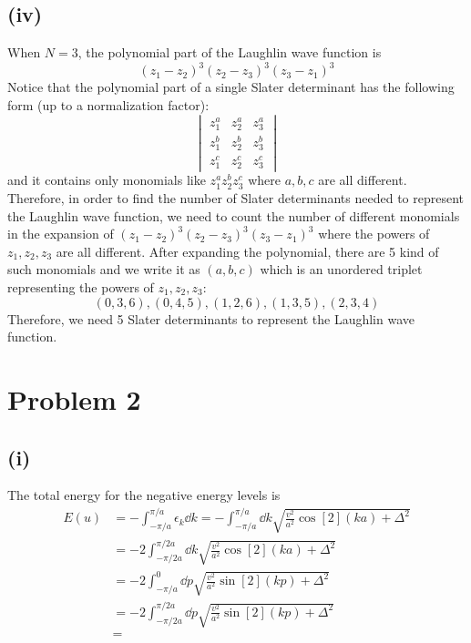 \documentclass{article}
\begin{document}
\subsection*{(iv)}
When $N=3$, the polynomial part of the Laughlin wave function is
\begin{equation}
    (z_1-z_2)^3(z_2-z_3)^3(z_3-z_1)^3
\end{equation}
Notice that the polynomial part of a single Slater determinant has the following form (up to a normalization factor):
\begin{equation}
    \begin{vmatrix}
        z_1^{a} & z_2^{a} & z_3^{a}\\
        z_1^{b} & z_2^{b} & z_3^{b}\\
        z_1^{c} & z_2^{c} & z_3^{c}
    \end{vmatrix}
\end{equation}
and it contains only monomials like $z_1^{a}z_2^{b}z_3^{c}$ where $a,b,c$ are all different.
Therefore, in order to find the number of Slater determinants needed to represent the Laughlin wave function, we need to count the number of different monomials in the expansion of $(z_1-z_2)^3(z_2-z_3)^3(z_3-z_1)^3$ where the powers of $z_1,z_2,z_3$ are all different.
After expanding the polynomial, there are 5 kind of such monomials and we write it as $(a,b,c)$ which is an unordered triplet representing the powers of $z_1,z_2,z_3$:
\begin{equation}
    (0,3,6), (0,4,5), (1,2,6), (1,3,5), (2,3,4)
\end{equation}
Therefore, we need 5 Slater determinants to represent the Laughlin wave function.

\section*{Problem 2}
\subsection*{(i)}
The total energy for the negative energy levels is
\begin{equation}
    \begin{split}
        E(u)&=-\int_{-\pi/a}^{\pi/a}\epsilon_k \dd{k}=-\int_{-\pi/a}^{\pi/a} \dd{k}\sqrt{\frac{v^2}{a^2}\cos[2](ka)+\Delta^2}\\
            &=-2\int_{-\pi/2a}^{\pi/2a} \dd{k}\sqrt{\frac{v^2}{a^2}\cos[2](ka)+\Delta^2}\\
            &=-2\int_{-\pi/a}^{0}\dd{p}\sqrt{\frac{v^2}{a^2}\sin[2](kp)+\Delta^2}\\
            &=-2\int_{-\pi/2a}^{\pi/2a}\dd{p}\sqrt{\frac{v^2}{a^2}\sin[2](kp)+\Delta^2}\\
            &=
    \end{split}
\end{equation}
\end{document}
